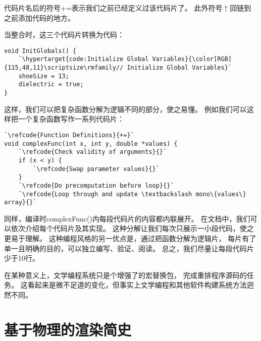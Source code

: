 代码片名后的符号{\codecolor +=}表示我们之前已经定义过该代码片了。
此外符号{\codecolor $\uparrow$}回链到
之前添加代码的地方。

当整合时，这三个代码片转换为代码：
\begin{lstlisting}
void InitGlobals() {
    `\hypertarget{code:Initialize Global Variables}{\color[RGB]{115,48,11}\scriptsize\rmfamily// Initialize Global Variables}`
    shoeSize = 13;
    dielectric = true;
}
\end{lstlisting}

这样，我们可以把复杂函数分解为逻辑不同的部分，使之易懂。
例如我们可以这样把一个复杂函数写作一系列代码片：
\begin{lstlisting}
`\refcode{Function Definitions}{+=}`
void complexFunc(int x, int y, double *values) {
    `\refcode{Check validity of arguments}{}`
    if (x < y) {
        `\refcode{Swap parameter values}{}`
    }
    `\refcode{Do precomputation before loop}{}`
    `\refcode{Loop through and update \textbackslash mono\{values\} array}{}`
\end{lstlisting}

同样，编译时{\ttfamily complexFunc()}内每段代码片的内容都内联展开。
在文档中，我们可以依次介绍每个代码片及其实现。
这种分解让我们每次只展示一小段代码，使之更易于理解。
这种编程风格的另一优点是，通过把函数分解为逻辑片，
每片有了单一且明确的目的，可以独立编写、验证、阅读。
总之，我们尽量让每段代码片少于10行。

在某种意义上，文学编程系统只是个增强了的宏替换包，
完成重排程序源码的任务。
这看起来是微不足道的变化，但事实上文学编程和其他软件构建系统方法迥然不同。

\section{基于物理的渲染简史}\label{sec:基于物理的渲染简史}

